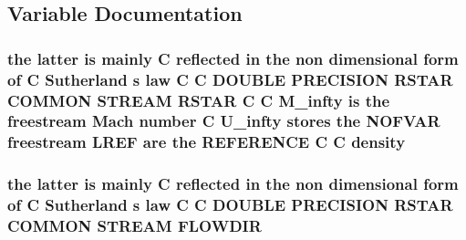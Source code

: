 \subsection{Variable Documentation}
\hypertarget{msa20_2home_2abonfi_2_c_f_d__codes_2_eul_f_s_83_82_83_2include_2stream_8com_ae3461cde09d7d40d4800995573999b7e}{
\subsubsection[{density}]{\setlength{\rightskip}{0pt plus 5cm}the latter is mainly C reflected in the non dimensional form of C Sutherland s law C C D\-O\-U\-B\-L\-E P\-R\-E\-C\-I\-S\-I\-O\-N R\-S\-T\-A\-R C\-O\-M\-M\-O\-N S\-T\-R\-E\-A\-M R\-S\-T\-A\-R C C {\bf M\-\_\-infty} is the freestream Mach number C {\bf U\-\_\-infty} stores the N\-O\-F\-V\-A\-R freestream {\bf L\-R\-E\-F} {\bf are} the R\-E\-F\-E\-R\-E\-N\-C\-E C C density}}\label{msa20_2home_2abonfi_2_c_f_d__codes_2_eul_f_s_83_82_83_2include_2stream_8com_ae3461cde09d7d40d4800995573999b7e}
\hypertarget{msa20_2home_2abonfi_2_c_f_d__codes_2_eul_f_s_83_82_83_2include_2stream_8com_af5929b7a58c2e64c3b9908fd35bc0e5a}{
\subsubsection[{F\-L\-O\-W\-D\-I\-R}]{\setlength{\rightskip}{0pt plus 5cm}the latter is mainly C reflected in the non dimensional form of C Sutherland s law C C D\-O\-U\-B\-L\-E P\-R\-E\-C\-I\-S\-I\-O\-N R\-S\-T\-A\-R C\-O\-M\-M\-O\-N S\-T\-R\-E\-A\-M F\-L\-O\-W\-D\-I\-R}}\label{msa20_2home_2abonfi_2_c_f_d__codes_2_eul_f_s_83_82_83_2include_2stream_8com_af5929b7a58c2e64c3b9908fd35bc0e5a}
